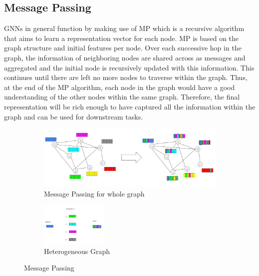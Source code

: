 \documentclass{report} %
\begin{document}
\subsection{Message Passing}\label{subsec:MP}

\ac{GNN}s in general function by making use of \ac{MP} which is a recursive algorithm that aims to learn a representation vector for each node. 
\ac{MP} is based on the graph structure and initial features per node. Over each successive hop in the graph, the information of neighboring nodes are 
shared across as messages and aggregated and the initial node is recursively updated with this information. This continues until there are left no more nodes to traverse 
within the graph. Thus, at the end of the \ac{MP} algorithm, each node in the graph would have a good understanding of the other nodes within the same graph.
Therefore, the final representation will be rich enough to have captured all the information within the graph and can be used for downstream tasks.\\

\begin{figure}[H]
    \centering
    \begin{subfigure}{\textwidth}
        \centering
        \includegraphics[width=.9\textwidth]{./ReportImages/HomogeneousMP.png} 
        \caption{Message Passing for whole graph} 
        \label{fig:Message Passing for whole graph}
    \end{subfigure}\vfill
    \begin{subfigure}{\textwidth}
        \centering
        \includegraphics[width=0.35\textwidth]{./ReportImages/HomogeneousMP1Node.png}
        \caption{Heterogeneous Graph}
        \label{fig:Message Passing for 1 Node}
    \end{subfigure}
    \caption{Message Passing}
    \label{fig:Message Passing}
\end{figure}
\end{document}
